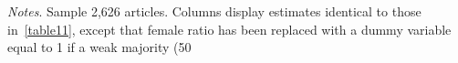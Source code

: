 \begin{table}[H]
\begin{adjustwidth}{-0.085cm}{}
\begin{threeparttable}
\begin{tabular}{p{2.64cm}SSSSSSS}
            \bottomrule
        \end{tabular}
        \begin{tablenotes}
            \tiny
            \item \textit{Notes}. Sample 2,626 articles. Columns display estimates identical to those in~\autoref{table11}, except that female ratio has been replaced with a dummy variable equal to 1 if a weak majority (50%
        \end{tablenotes}
    \end{threeparttable}
    \end{adjustwidth}
\end{table}